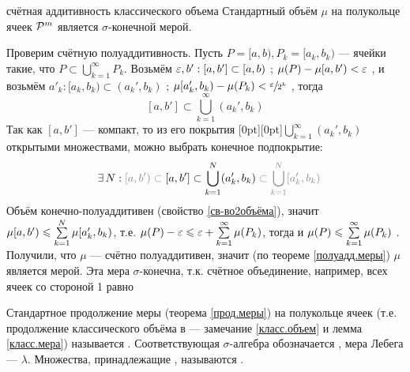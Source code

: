 \begin{lem}[https://www.youtube.com/live/Ptfcl76lZBs?si=oHYtEkpssSIjI8CP&t=11668]{счётная аддитивность классического объема}\label{класс.мера}%
	Стандартный объём $\mu$ на полукольце ячеек $\mathcal{P}^m$ \uns{$\bigl(\A [a,b) \in \p^m\ \mu[a,b) = \prod\limits_{i = 1}^m (b_i - a_i)\bigr)$} является $\sigma$-конечной мерой. 
\end{lem}

\begin{prf}
	Проверим счётную полуаддитивность. Пусть $P = [a, b), P_k = [a_k, b_k)$ --- ячейки такие, что $P \subset \bigcup\limits_{k = 1}^\infty P_k$. Возьмём $\varepsilon, b' : [a, b'] \subset [a, b)$ ; $\mu(P) - \mu[a, b') < \varepsilon$ , и возьмём $a'_k : [a_k, b_k) \subset (a_k', b_k)$ ; $\mu[a'_k, b_k) - \mu(P_k) < \sfrac{\varepsilon}{2^k}$ , тогда \[[a, b'] \subset \bigcup_{k = 1}^\infty (a_k', b_k)\]
	Так как $[a, b']$ --- компакт, то из его покрытия \raisebox{0pt}[0pt][0pt]{$\bigcup\limits_{k = 1}^\infty (a_k', b_k)$} открытыми множествами, можно выбрать конечное подпокрытие: 
	\[\E N : \uns{[a, b') \subset{}} [a, b'] \subset \bigcup_{k = 1}^N (a_k', b_k) \uns{{}\subset \bigcup_{k = 1}^N [a_k', b_k)}\]
	Объём конечно-полуаддитивен (свойство \ref{св-во2объёма}), значит $\mu[a, b') \leqslant \sum\limits_{k = 1}^N \mu[a_k', b_k)$, т.е. $\mu(P) - \eps \< \eps + \raisebox{0pt}[0pt]{$\sum\limits_{k = 1}^\infty\mu(P_k)$}$, тогда и $\mu(P) \< \raisebox{0pt}[0pt]{$\sum\limits_{k = 1}^\infty\mu(P_k)$}$ . Получили, что $\mu$ --- счётно полуаддитивен, значит (по теореме \ref{полуадд.меры}) $\mu$ является мерой. Эта мера $\sigma$-конечна, т.к. счётное объединение, например, всех ячеек со стороной 1 равно \rmm  
\end{prf}

\begin{opr}\label{мера лебега}
	Стандартное продолжение меры (теорема \ref{прод.меры}) на полукольце ячеек (т.е. продолжение классического объёма в \rmm --- замечание \ref{класс.объем} и лемма \ref{класс.мера}) называется . Соответствующая $\sigma$-алгебра обозначается \m, мера Лебега --- $\lambda$. Множества, принадлежащие \m, называются .
\end{opr}

